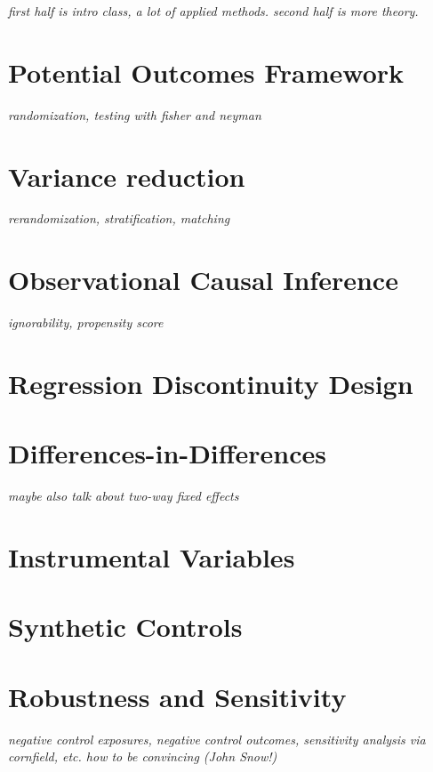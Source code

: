 \documentclass[../../../main.tex]{subfiles}
\begin{document}

\textit{first half is intro class, a lot of applied methods. second half is more theory.}

\section{Potential Outcomes Framework}
\textit{randomization, testing with fisher and neyman}

\section{Variance reduction}
\textit{rerandomization, stratification, matching}

\section{Observational Causal Inference}
\textit{ignorability, propensity score}

\section{Regression Discontinuity Design}

\section{Differences-in-Differences}
\textit{maybe also talk about two-way fixed effects}

\section{Instrumental Variables}

\section{Synthetic Controls}

\section{Robustness and Sensitivity}
\textit{negative control exposures, negative control outcomes, sensitivity analysis via cornfield, etc. how to be convincing (John Snow!)}
\end{document}
